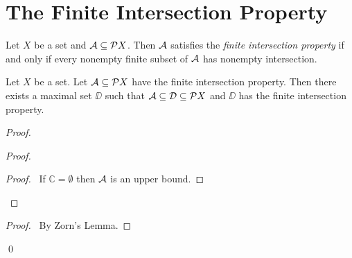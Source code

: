 \section{The Finite Intersection Property}

\begin{definition}
    Let $X$ be a set and $\AA \subseteq \pow X$. Then $\AA$ satisfies the \emph{finite intersection property} if and only if every nonempty finite subset of $\AA$
    has nonempty intersection.
\end{definition}

\begin{lemma}
    \label{lemma:maximal_finite_intersection_property}
    Let $X$ be a set. Let $\AA \subseteq \pow X$ have the finite intersection property.
    Then there exists a maximal set $\DD$ such that $\AA \subseteq \DD \subseteq \pow X$
    and $\DD$ has the finite intersection property.
\end{lemma}

\begin{proof}
    \pf
    \begin{proof}
        \begin{proof}
            \pf\ If $\mathbb{C} = \emptyset$ then $\AA$ is an upper bound.
        \end{proof}
    \end{proof}
    \qedstep
    \begin{proof}
        \pf\ By Zorn's Lemma.
    \end{proof}
    \qed
\end{proof}

